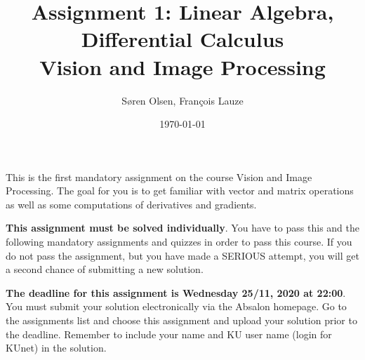 \documentclass[a4paper,10pt]{article}
\begin{document}
\title{Assignment 1: Linear Algebra, Differential Calculus\\
Vision and Image Processing}
\author{S{\o}ren Olsen, Fran\c{c}ois Lauze}
\date{\today}
\maketitle


\noindent 
This is the first mandatory assignment on the course Vision and Image
Processing. The goal for you is to get familiar with vector and matrix operations as well as some computations of derivatives and gradients.
\bigskip

{\bf This assignment must be solved individually}.  You have to pass
this and the following mandatory assignments and quizzes in order to
pass this course.  If you do not pass the assignment, but you have
made a SERIOUS attempt, you will get a second chance of submitting a
new solution.  
\bigskip

{\bf The deadline for this assignment is Wednesday 25/11, 2020 at 22:00}. 
You must submit your solution electronically via the Absalon homepage. Go to
the assignments list and choose this assignment and upload your
solution prior to the deadline.  Remember to include your name and KU
user name (login for {KU}net) in the solution. 
\end{document}
